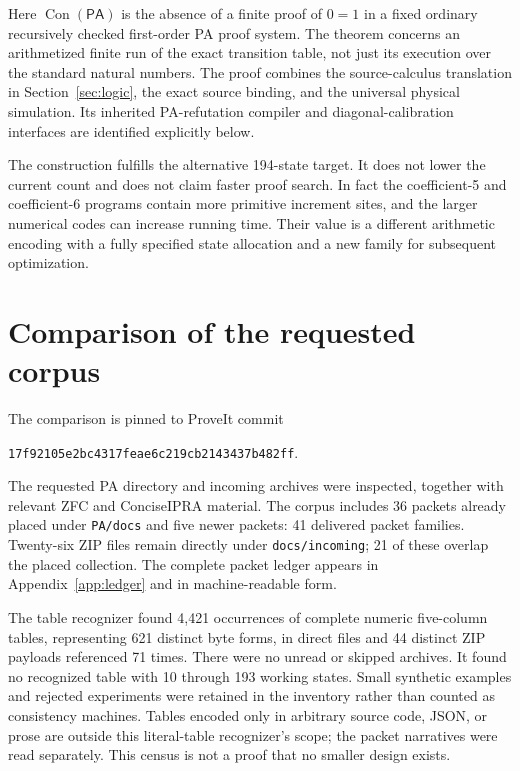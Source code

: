 \documentclass[10pt,letterpaper]{article}
\newcommand{\PA}{\mathsf{PA}}
\newcommand{\Con}{\operatorname{Con}}
\newcommand{\file}[1]{\nolinkurl{#1}}
\begin{document}
Here $\Con(\PA)$ is the absence of a finite proof of $0=1$ in a fixed ordinary recursively checked first-order PA proof system. The theorem concerns an arithmetized finite run of the exact transition table, not just its execution over the standard natural numbers. The proof combines the source-calculus translation in Section~\ref{sec:logic}, the exact source binding, and the universal physical simulation. Its inherited PA-refutation compiler and diagonal-calibration interfaces are identified explicitly below.

The construction fulfills the alternative 194-state target. It does not lower the current count and does not claim faster proof search. In fact the coefficient-5 and coefficient-6 programs contain more primitive increment sites, and the larger numerical codes can increase running time. Their value is a different arithmetic encoding with a fully specified state allocation and a new family for subsequent optimization.



\section{Comparison of the requested corpus}
\label{sec:corpus}

The comparison is pinned to ProveIt commit
\begin{center}\small\texttt{17f92105e2bc4317feae6c219cb2143437b482ff}.\end{center}
The requested PA directory and incoming archives were inspected, together with relevant ZFC and ConciseIPRA material. The corpus includes 36 packets already placed under \file{PA/docs} and five newer packets: 41 delivered packet families. Twenty-six ZIP files remain directly under \file{docs/incoming}; 21 of these overlap the placed collection. The complete packet ledger appears in Appendix~\ref{app:ledger} and in machine-readable form.

The table recognizer found 4,421 occurrences of complete numeric five-column tables, representing 621 distinct byte forms, in direct files and 44 distinct ZIP payloads referenced 71 times. There were no unread or skipped archives. It found no recognized table with 10 through 193 working states. Small synthetic examples and rejected experiments were retained in the inventory rather than counted as consistency machines. Tables encoded only in arbitrary source code, JSON, or prose are outside this literal-table recognizer's scope; the packet narratives were read separately. This census is not a proof that no smaller design exists.
\end{document}
